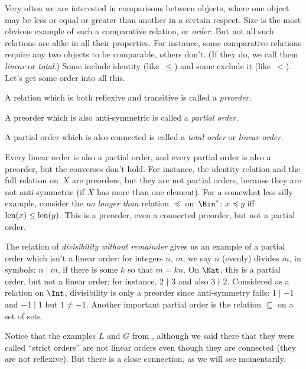 \documentclass[../../../include/open-logic-section]{subfiles}
\begin{document}

\begin{explain}
Very often we are interested in comparisons between objects, where one
object may be less or equal or greater than another in a certain
respect.  Size is the most obvious example of such a comparative
relation, or \emph{order}. But not all such relations are alike in all
their properties. For instance, some comparative relations require any
two objects to be comparable, others don't. (If they do, we call them
\emph{linear} or \emph{total}.) Some include identity (like~$\le$) and
some exclude it (like~$<$). Let's get some order into all this.
\end{explain}

\begin{defn}[Preorder]
A relation which is both reflexive and transitive is called a
\emph{preorder.}  
\end{defn}

\begin{defn}
A preorder which is also anti-symmetric is called a
\emph{partial order}.
\end{defn}

\begin{defn}
A partial order which is also connected is called a
\emph{total order} or \emph{linear order.}
\end{defn}

\begin{ex}
Every linear order is also a partial order, and every partial order is
also a preorder, but the converses don't hold. For instance, the
identity relation and the full relation on~$X$ are preorders, but they
are not partial orders, because they are not anti-symmetric (if $X$
has more than one element). For a somewhat less silly example,
consider the \emph{no longer than} relation $\preccurlyeq$
on~$\Bin^*$: $x \preccurlyeq y$ iff $\mathrm{len}(x) \le \mathrm{len}(y)$. This is a
preorder, even a connected preorder, but not a partial order.

The relation of \emph{divisibility without remainder} gives us an
example of a partial order which isn't a linear order: for integers
$n$, $m$, we say $n$ (evenly) divides $m$, in symbols: $n\mid m$, if
there is some $k$ so that $m=kn$. On $\Nat$, this is a partial order,
but not a linear order: for instance, $2\nmid3$ and also
$3\nmid2$. Considered as a relation on $\Int$, divisibility is only a
preorder since anti-symmetry fails: $1\mid-1$ and $-1\mid1$ but
$1\neq-1$. Another important partial order is the relation $\subseteq$
on a set of sets.

Notice that the examples $L$ and $G$ from ,
although we said there that they were called ``strict orders'' are not
linear orders even though they are connected (they are not
reflexive). But there is a close connection, as we will see
momentarily.
\end{ex}
\end{document}
